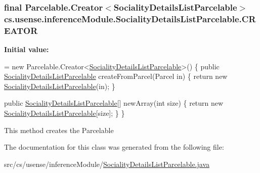 \subsubsection[{C\+R\+E\+A\+T\+O\+R}]{\setlength{\rightskip}{0pt plus 5cm}final Parcelable.\+Creator$<${\bf Sociality\+Details\+List\+Parcelable}$>$ cs.\+usense.\+inference\+Module.\+Sociality\+Details\+List\+Parcelable.\+C\+R\+E\+A\+T\+O\+R\hspace{0.3cm}{\ttfamily [static]}}\label{classcs_1_1usense_1_1inference_module_1_1_sociality_details_list_parcelable_a29b5539c9f93da052afa4aab3fc20e84}
{\bfseries Initial value\+:}
\begin{DoxyCode}
=
            \textcolor{keyword}{new} Parcelable.Creator<\hyperlink{classcs_1_1usense_1_1inference_module_1_1_sociality_details_list_parcelable_a50d705fdd1a117ad6d7ac0ebf090511b}{SocialityDetailsListParcelable}>() \{
        \textcolor{keyword}{public} \hyperlink{classcs_1_1usense_1_1inference_module_1_1_sociality_details_list_parcelable_a50d705fdd1a117ad6d7ac0ebf090511b}{SocialityDetailsListParcelable} createFromParcel(Parcel in) \{
            \textcolor{keywordflow}{return} \textcolor{keyword}{new} \hyperlink{classcs_1_1usense_1_1inference_module_1_1_sociality_details_list_parcelable_a50d705fdd1a117ad6d7ac0ebf090511b}{SocialityDetailsListParcelable}(in);
        \}

        \textcolor{keyword}{public} \hyperlink{classcs_1_1usense_1_1inference_module_1_1_sociality_details_list_parcelable_a50d705fdd1a117ad6d7ac0ebf090511b}{SocialityDetailsListParcelable}[] newArray(\textcolor{keywordtype}{int} size) \{
            \textcolor{keywordflow}{return} \textcolor{keyword}{new} \hyperlink{classcs_1_1usense_1_1inference_module_1_1_sociality_details_list_parcelable_a50d705fdd1a117ad6d7ac0ebf090511b}{SocialityDetailsListParcelable}[size];
        \}
    \}
\end{DoxyCode}
This method creates the Parcelable 

The documentation for this class was generated from the following file\+:\begin{DoxyCompactItemize}
\item 
src/cs/usense/inference\+Module/\hyperlink{_sociality_details_list_parcelable_8java}{Sociality\+Details\+List\+Parcelable.\+java}\end{DoxyCompactItemize}
